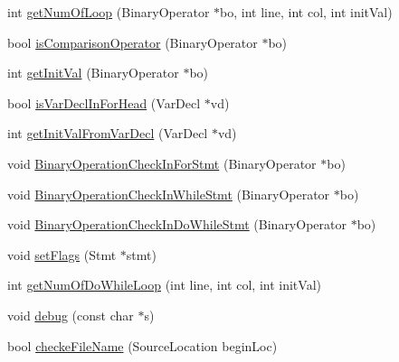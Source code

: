 \begin{DoxyCompactItemize}
\item 
int \hyperlink{classSlowMemoryChecker_a0ab606cbdde59e08633052c1f14d9943}{get\+Num\+Of\+Loop} (Binary\+Operator $\ast$bo, int line, int col, int init\+Val)
\item 
bool \hyperlink{classSlowMemoryChecker_a0f71da7aae4b71c12a7b9d6b9bea38ee}{is\+Comparison\+Operator} (Binary\+Operator $\ast$bo)
\item 
int \hyperlink{classSlowMemoryChecker_a38de8a47b69ae3a78d731419aef3be0b}{get\+Init\+Val} (Binary\+Operator $\ast$bo)
\item 
bool \hyperlink{classSlowMemoryChecker_add99de7c17a94aaa19f4d3a73a3c54e3}{is\+Var\+Decl\+In\+For\+Head} (Var\+Decl $\ast$vd)
\item 
int \hyperlink{classSlowMemoryChecker_a6af096fd1aa1fdb3bedcf5a6909356e3}{get\+Init\+Val\+From\+Var\+Decl} (Var\+Decl $\ast$vd)
\item 
void \hyperlink{classSlowMemoryChecker_a0e208795d7bc6296d088333ae56f4b05}{Binary\+Operation\+Check\+In\+For\+Stmt} (Binary\+Operator $\ast$bo)
\item 
void \hyperlink{classSlowMemoryChecker_a0381c1159a96a8aa62ec77770d37a1e2}{Binary\+Operation\+Check\+In\+While\+Stmt} (Binary\+Operator $\ast$bo)
\item 
void \hyperlink{classSlowMemoryChecker_a15bcf8610e7d2c320e6f421cbaacb7a2}{Binary\+Operation\+Check\+In\+Do\+While\+Stmt} (Binary\+Operator $\ast$bo)
\item 
void \hyperlink{classSlowMemoryChecker_a5fa3e63b12a71fa0e9a01b2dd7fca80e}{set\+Flags} (Stmt $\ast$stmt)
\item 
int \hyperlink{classSlowMemoryChecker_a945d8af10cfed2f24e0ac9918d1b9594}{get\+Num\+Of\+Do\+While\+Loop} (int line, int col, int init\+Val)
\item 
void \hyperlink{classSlowMemoryChecker_a00c873c2d0209a6b94522162fac916ea}{debug} (const char $\ast$s)
\item 
bool \hyperlink{classSlowMemoryChecker_a0240abd96c40e96419ff7cb30b853ac4}{checke\+File\+Name} (Source\+Location begin\+Loc)
\end{DoxyCompactItemize}
